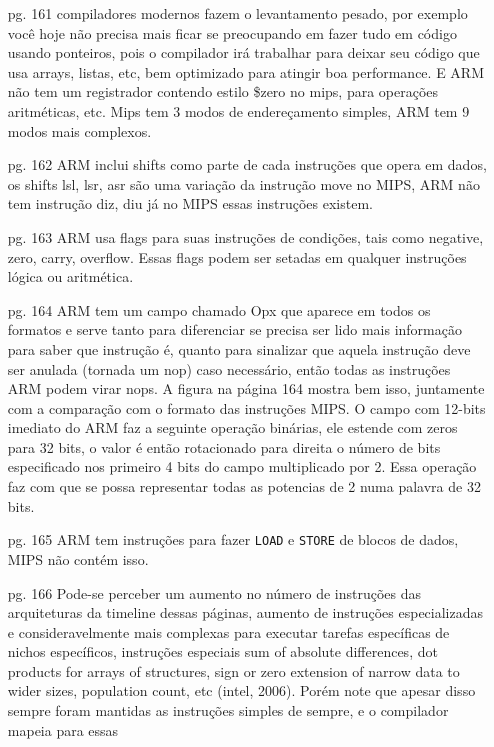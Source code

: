 \documentclass{article}
\begin{document}
\begin{enumerate}

\item[pg. 161] compiladores modernos fazem o levantamento pesado, por exemplo
você hoje não precisa mais ficar se preocupando em fazer tudo em código usando
ponteiros, pois o compilador irá trabalhar para deixar seu código que usa
arrays, listas, etc, bem optimizado para atingir boa performance. E ARM não tem
um registrador contendo estilo \$zero no mips, para operações aritméticas, etc.
Mips tem 3 modos de endereçamento simples, ARM tem 9 modos mais complexos.
\item[pg. 162] ARM inclui shifts como parte de cada instruções que opera em
dados, os shifts lsl, lsr, asr são uma variação da instrução move no MIPS, ARM
não tem instrução diz, diu já no MIPS essas instruções existem. \item[pg. 163]
ARM usa flags para suas instruções de condições, tais como negative, zero,
carry, overflow. Essas flags podem ser setadas em qualquer instruções lógica ou
aritmética.
\item[pg. 164] ARM tem um campo chamado Opx que aparece em todos os formatos e 
serve tanto para diferenciar se precisa ser lido mais informação para saber que 
instrução é, quanto para sinalizar que aquela instrução deve ser anulada 
(tornada um nop) caso necessário, então todas as instruções ARM podem virar 
nops. A figura na página 164 mostra bem isso, juntamente com a comparação com o 
formato das instruções MIPS. O campo com 12-bits imediato do ARM faz a seguinte 
operação binárias, ele estende com zeros para 32 bits, o valor é então 
rotacionado para direita o número de bits especificado nos primeiro 4 bits do 
campo multiplicado por 2. Essa operação faz com que se possa representar todas 
as potencias de 2 numa palavra de 32 bits.
\item[pg. 165] ARM tem instruções para fazer \verb|LOAD| e \verb|STORE| de 
blocos de dados, MIPS não contém isso.
\item[pg. 166] Pode-se perceber um aumento no número de instruções das
arquiteturas da timeline dessas páginas, aumento de instruções especializadas e
consideravelmente mais complexas para executar tarefas específicas de nichos
específicos, instruções especiais sum of absolute differences, dot products for
arrays of structures, sign or zero extension of narrow data to wider sizes,
population count, etc (intel, 2006). Porém note que apesar disso sempre foram
mantidas as instruções simples de sempre, e o compilador mapeia para essas

\end{enumerate}
\end{document}
